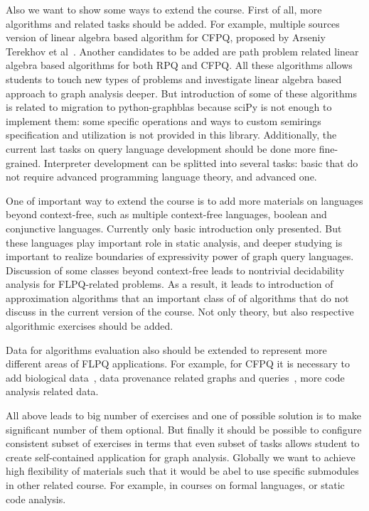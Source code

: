 \documentclass[sigconf]{acmart}
\begin{document}
Also we want to show some ways to extend the course. 
First of all, more algorithms and related tasks should be added.
For example, multiple sources version of linear algebra based algorithm for CFPQ, proposed by Arseniy Terekhov et al~\cite{terekhov2021multiple}.
Another candidates to be added are path problem related linear algebra based algorithms for both RPQ and CFPQ.
All these algorithms allows students to touch new types of problems and investigate linear algebra based approach to graph analysis deeper.
But introduction of some of these algorithms is related to migration to python-graphblas because sciPy is not enough to implement them: some specific operations and ways to custom semirings specification and utilization is not provided in this library.
Additionally, the current last tasks on query language development should be done more fine-grained. 
Interpreter development can be splitted into several tasks: basic that do not require advanced programming language theory, and advanced one.

One of important way to extend the course is to add more materials on languages beyond context-free, such as multiple context-free languages, boolean and conjunctive languages. 
Currently only basic introduction only presented. 
But these languages play important role in static analysis, and deeper studying is important to realize boundaries of expressivity power of graph query languages.
Discussion of some classes beyond context-free leads to nontrivial decidability analysis for FLPQ-related problems.
As a result, it leads to introduction of approximation algorithms that an important class of of algorithms that do not discuss in the current version of the course.
Not only theory, but also respective algorithmic exercises should be added.

Data for algorithms evaluation also should be extended to represent more different areas of FLPQ applications.
For example, for CFPQ it is necessary to add biological data~\cite{SevonEronen+2008+157+172}, data provenance related graphs and queries~\cite{8731467}, more code analysis related data.

All above leads to big number of exercises and one of possible solution is to make significant number of them optional.
But finally it should be possible to configure consistent subset of exercises in terms that even subset of tasks allows student to create self-contained application for graph analysis.
Globally we want to achieve high flexibility of materials such that it would be abel to use specific submodules in other related course.
For example, in courses on formal languages, or static code analysis.




\end{document}

